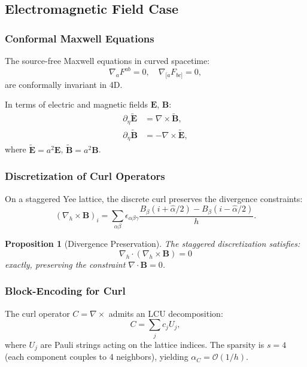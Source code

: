 \documentclass[11pt,a4paper]{article}
\newcommand{\Order}{\mathcal{O}}
\theoremstyle{plain}
\newtheorem{proposition}[theorem]{Proposition}
\theoremstyle{definition}
\theoremstyle{remark}
\begin{document}
\subsection{Electromagnetic Field Case}\label{subsec:em_case}

\subsubsection{Conformal Maxwell Equations}

The source-free Maxwell equations in curved spacetime:
\begin{equation}
    \nabla_a F^{ab} = 0, \quad \nabla_{[a}F_{bc]} = 0,
\end{equation}
are conformally invariant in 4D.

In terms of electric and magnetic fields $\bm{E}$, $\bm{B}$:
\begin{align}
    \partial_\eta \tilde{\bm{E}} &= \nabla \times \tilde{\bm{B}},\\
    \partial_\eta \tilde{\bm{B}} &= -\nabla \times \tilde{\bm{E}},
\end{align}
where $\tilde{\bm{E}} = a^2 \bm{E}$, $\tilde{\bm{B}} = a^2 \bm{B}$.

\subsubsection{Discretization of Curl Operators}

On a staggered Yee lattice, the discrete curl preserves the divergence constraints:
\begin{equation}
    (\nabla_h \times \bm{B})_i = \sum_{\alpha\beta} \epsilon_{\alpha\beta\gamma} \frac{B_\beta(i + \hat{\alpha}/2) - B_\beta(i - \hat{\alpha}/2)}{h}.
\end{equation}

\begin{proposition}[Divergence Preservation]
The staggered discretization satisfies:
\begin{equation}
    \nabla_h \cdot (\nabla_h \times \bm{B}) = 0
\end{equation}
exactly, preserving the constraint $\nabla \cdot \bm{B} = 0$.
\end{proposition}

\subsubsection{Block-Encoding for Curl}

The curl operator $C = \nabla \times$ admits an LCU decomposition:
\begin{equation}
    C = \sum_{j} c_j U_j,
\end{equation}
where $U_j$ are Pauli strings acting on the lattice indices. The sparsity is $s = 4$ (each component couples to 4 neighbors), yielding $\alpha_C = \Order(1/h)$.
\end{document}
